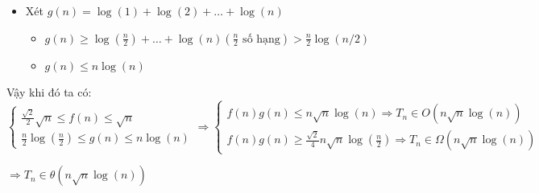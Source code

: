 \documentclass[12pt,a4paper]{article}
\begin{document}
\begin{enumerate}[label=\textbf{Câu 2.\arabic*} ]
\begin{itemize}[label=$\bullet$]
            \item Xét $g(n)=\log(1)+\log(2)+\dots+\log(n)$
            \begin{itemize}[label=$\bullet$]
                \item $g(n) \geq \log(\frac{n}{2})+\dots+\log(n)(\frac{n}{2}\text{ số hạng})>\frac{n}{2}\log(n/2)$
                \item $g(n)\leq n\log(n)$
            \end{itemize}
        \end{itemize}
        Vậy khi đó ta có:$\begin{cases}
            \frac{\sqrt{2}}{2}\sqrt{n}\leq f(n)\leq\sqrt{n}\\
            \frac{n}{2}\log(\frac{n}{2})\leq g(n)\leq n\log(n)
        \end{cases}
        \Rightarrow \begin{cases}
            f(n)g(n)\leq n\sqrt{n}\log(n)\Rightarrow T_{n} \in O(n\sqrt{n}\log(n))\\
            f(n)g(n)\geq \frac{\sqrt{2}}{4}n\sqrt{n}\log(\frac{n}{2})\Rightarrow T_{n} \in \Omega(n\sqrt{n}\log(n))
        \end{cases}$
        \begin{center}
            $\Rightarrow T_{n}\in \theta (n\sqrt{n}\log(n))$
        \end{center}
    \end{enumerate}
    
\end{document}
